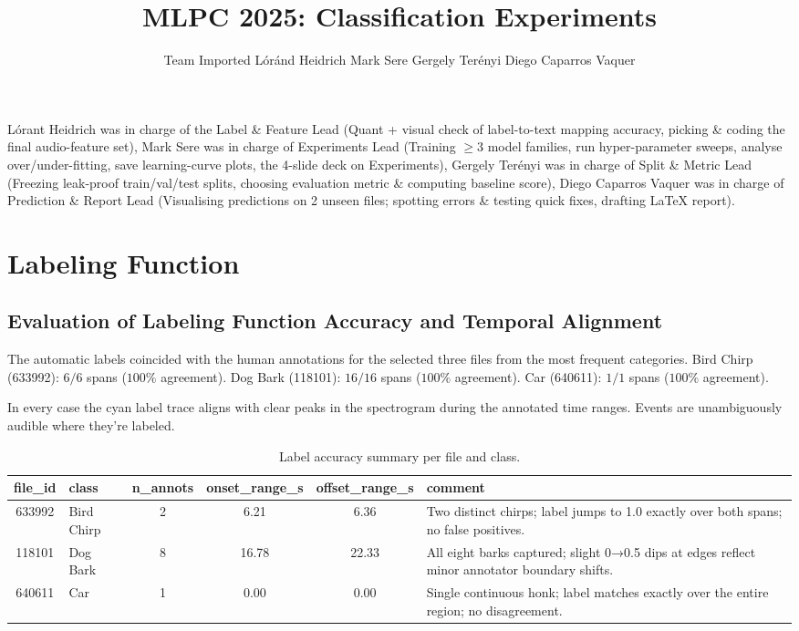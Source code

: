 \documentclass{article}
\title{MLPC 2025: Classification Experiments}
\author{
  Team Imported \AND
  Lóránd Heidrich
  \And
  Mark Sere
  \And 
  Gergely Terényi
  \And 
  Diego Caparros Vaquer
}
\begin{document}
\maketitle


\begin{contributions}
Lórant Heidrich was in charge of the Label \& Feature Lead (Quant + visual check of label-to-text mapping accuracy, picking \& coding the final audio-feature set), Mark Sere was in charge of  Experiments Lead (Training $\geq 3$ model families, run hyper-parameter sweeps, analyse over/under-fitting, save learning-curve plots, the 4-slide deck on Experiments), Gergely Terényi was in charge of Split \& Metric Lead (Freezing leak-proof train/val/test splits, choosing evaluation metric \& computing baseline score), Diego Caparros Vaquer was in charge of Prediction \& Report Lead (Visualising predictions on 2 unseen files; spotting errors \& testing quick fixes, drafting LaTeX report).
\end{contributions}

\section{Labeling Function}

\subsection{Evaluation of Labeling Function Accuracy and Temporal Alignment}

The automatic labels coincided with the human annotations for the selected three files from the most frequent categories. Bird Chirp (633992): $6 / 6$ spans ($100\%$ agreement). Dog Bark (118101): $16 / 16$ spans ($100 \%$ agreement). Car (640611): $1 / 1$ spans ($100 \%$ agreement).

In every case the cyan label trace aligns with clear peaks in the spectrogram during the annotated time ranges. Events are unambiguously audible where they’re labeled.
\begin{table}[ht]
\centering
\small
\begin{tabular}{c l c c c p{6cm}}
\toprule
\textbf{file\_id} & \textbf{class} & \textbf{n\_annots} & \textbf{onset\_range\_s} & \textbf{offset\_range\_s} & \textbf{comment} \\
\midrule
633992  & Bird Chirp & 2 & 6.21 & 6.36 & Two distinct chirps; label jumps to 1.0 exactly over both spans; no false positives. \\
118101  & Dog Bark   & 8 & 16.78 & 22.33 & All eight barks captured; slight 0→0.5 dips at edges reflect minor annotator boundary shifts. \\
640611  & Car        & 1 & 0.00 & 0.00 & Single continuous honk; label matches exactly over the entire region; no disagreement. \\
\bottomrule
\end{tabular}
\caption{Label accuracy summary per file and class.}
\end{table}
\end{document}
